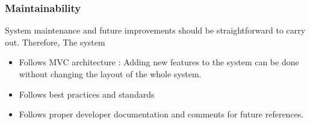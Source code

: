 \subsubsection{Maintainability}
System maintenance and future improvements should be straightforward to carry out. Therefore,
The system
\begin{itemize}
    \item Follows MVC architecture : Adding new features to the system can be done without changing the layout of the whole system.
    \item Follows best practices and standards
    \item Follows proper developer documentation and comments for future references. 
\end{itemize}